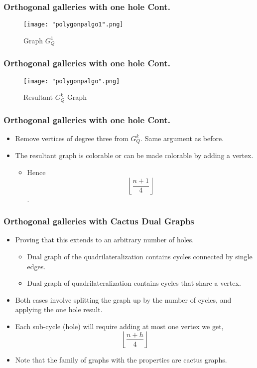 \documentclass{beamer}
\begin{document}
\begin{frame}
\frametitle{Orthogonal galleries with one hole Cont.}
	\begin{center}
	\begin{figure}[H]
	\caption{Graph $G^{1}_Q$}
	\centering
	\texttt{[image: "polygonpalgo1".png]}
	\end{figure}
	\end{center}
\end{frame}


\begin{frame}
\frametitle{Orthogonal galleries with one hole Cont.}
	\begin{center}
	\begin{figure}[H]
	\caption{Resultant $G^{k}_Q$ Graph}
	\centering
	\texttt{[image: "polygonpalgo".png]}
	\end{figure}
	\end{center}
\end{frame}




\begin{frame}
\frametitle{Orthogonal galleries with one hole Cont.}
\begin{itemize}
	\item Remove vertices of degree three from $G^{k}_Q$. Same argument as before.  
	\vfill
	\item The resultant graph is colorable or can be made colorable by adding a vertex. 
		\begin{itemize}
			\item Hence $$\left \lfloor{\frac{n+1}{4}}\right \rfloor$$. 
		\end{itemize}
\end{itemize}
\end{frame}


\begin{frame}
\frametitle{Orthogonal galleries with Cactus Dual Graphs}
\begin{itemize}
	\item Proving that this extends to an arbitrary number of holes.   
	\vfill
		\begin{itemize}
		\item Dual graph of the quadrilateralization contains cycles connected by single edges.
		\vfill
		\item Dual graph of quadrilateralization contains cycles that share a vertex. 
		\end{itemize}
	\item Both cases involve splitting the graph up by the number of cycles, and applying the one hole result. 
	\vfill
	\item Each sub-cycle (hole) will require adding at most one vertex we get, $$\left \lfloor{\frac{n+h}{4}}\right \rfloor$$
	\vfill
	\item Note that the family of graphs with the properties are cactus graphs. 
\end{itemize}
\end{frame}
\end{document}
